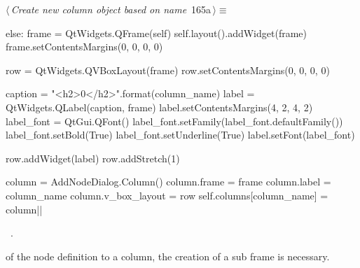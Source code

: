 \documentclass[%
    a4paper,    %
    justified,  %
    nobib,      %
    openany     %
]{tufte-book}
\makeatletter
\renewcommand{\label}[1]{\@tufte@label{##1}}%
\makeatother
\begin{document}
\begin{flushleft} \small
\begin{minipage}{\linewidth}\label{scrap159}\raggedright\small
{} $\langle\,${\itshape Create new column object based on name}\nobreak\ {\footnotesize {165a}}$\,\rangle\equiv$
\vspace{-1ex}
\begin{pythoncode}
else:
    frame = QtWidgets.QFrame(self)
    self.layout().addWidget(frame)
    frame.setContentsMargins(0, 0, 0, 0)

    row = QtWidgets.QVBoxLayout(frame)
    row.setContentsMargins(0, 0, 0, 0)

    caption = "<h2>{0}</h2>".format(column_name)
    label = QtWidgets.QLabel(caption, frame)
    label.setContentsMargins(4, 2, 4, 2)
    label_font = QtGui.QFont()
    label_font.setFamily(label_font.defaultFamily())
    label_font.setBold(True)
    label_font.setUnderline(True)
    label.setFont(label_font)

    row.addWidget(label)
    row.addStretch(1)

    column = AddNodeDialog.Column()
    column.frame = frame
    column.label = column_name
    column.v_box_layout = row
    self.columns[column_name] = column|\NWsep|
\end{pythoncode}
\vspace{1.5ex}
\footnotesize
\begin{list}{}{\setlength{\itemsep}{-\parsep}\setlength{\itemindent}{-\leftmargin}}
\item \NWtxtMacroRefIn\ .

\item{}
\end{list}
\end{minipage}\vspace{4ex}
\end{flushleft}
 of the node definition to a column,
the creation of a sub frame is necessary.
\end{document}
